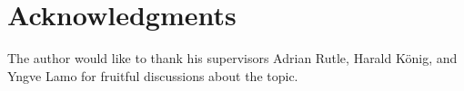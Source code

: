 \documentclass[a4paper]{easychair}
\begin{document}

\section{Acknowledgments} \label{sect:acks}
The author would like to thank his supervisors Adrian Rutle, Harald König, and Yngve Lamo for fruitful discussions about the topic.
\label{sect:bib}

%
%
%



\end{document}
